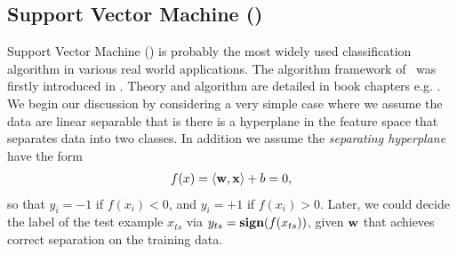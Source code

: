 

%
\subsection{Support Vector Machine (\svm)}
\label{sc_svm}

Support Vector Machine (\svm) is probably the most widely used classification algorithm in various real world applications.
The algorithm framework of \svm\ was firstly introduced in \citep{Boser92,Cortes95support}.
Theory and algorithm are detailed in book chapters e.g. \citep{Scholkopf02learning,taylor04,Bishop07}.
We begin our discussion by considering a very simple case where we assume the data are linear separable that is there is a hyperplane in the feature space that separates data into two classes.
In addition we assume the \textit{separating hyperplane} have the form
\begin{align*}
	f(x)=\langle \mathbf {w}, \mathbf {x} \rangle + b = 0,
\end{align*}
so that $y_i=-1$ if $f(x_i)<0$, and $y_i=+1$ if $f(x_i)>0$.
Later, we could decide the label of the test example $x_{ts}$ via $y_{ts}=\textbf{sign}(f(x_{ts}))$, given $\mathbf {w}$ that achieves correct separation on the training data.

